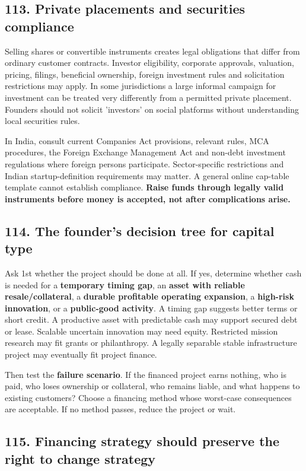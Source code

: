 \subsection{113. Private placements and securities compliance}


Selling shares or convertible instruments creates legal obligations that differ from ordinary customer contracts. Investor eligibility, corporate approvals, valuation, pricing, filings, beneficial ownership, foreign investment rules and solicitation restrictions may apply. In some jurisdictions a large informal campaign for investment can be treated very differently from a permitted private placement. Founders should not solicit 'investors' on social platforms without understanding local securities rules.

In India, consult current Companies Act provisions, relevant rules, MCA procedures, the Foreign Exchange Management Act and non-debt investment regulations where foreign persons participate. Sector-specific restrictions and Indian startup-definition requirements may matter. A general online cap-table template cannot establish compliance. \textbf{Raise funds through legally valid instruments before money is accepted, not after complications arise.}

\subsection{114. The founder's decision tree for capital type}


Ask 1st whether the project should be done at all. If yes, determine whether cash is needed for a \textbf{temporary timing gap}, an \textbf{asset with reliable resale/collateral}, a \textbf{durable profitable operating expansion}, a \textbf{high-risk innovation}, or a \textbf{public-good activity}. A timing gap suggests better terms or short credit. A productive asset with predictable cash may support secured debt or lease. Scalable uncertain innovation may need equity. Restricted mission research may fit grants or philanthropy. A legally separable stable infrastructure project may eventually fit project finance.

Then test the \textbf{failure scenario}. If the financed project earns nothing, who is paid, who loses ownership or collateral, who remains liable, and what happens to existing customers? Choose a financing method whose worst-case consequences are acceptable. If no method passes, reduce the project or wait.

\subsection{115. Financing strategy should preserve the right to change strategy}


